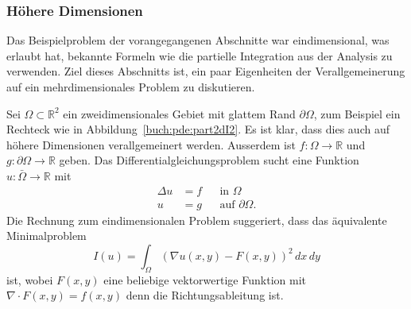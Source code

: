 \subsubsection{Höhere Dimensionen}
Das Beispielproblem der vorangegangenen Abschnitte war eindimensional,
was erlaubt hat, bekannte Formeln wie die partielle Integration aus der
Analysis zu verwenden.
Ziel dieses Abschnitts ist, ein paar Eigenheiten der Verallgemeinerung
auf ein mehrdimensionales Problem zu diskutieren.

Sei $\Omega\subset\mathbb R^2$ ein zweidimensionales Gebiet mit glattem
Rand $\partial \Omega$,
zum Beispiel ein Rechteck wie in Abbildung~\ref{buch:pde:part2dI2}.
Es ist klar, dass dies auch auf höhere Dimensionen verallgemeinert
werden.
Ausserdem ist $f\colon\Omega\to\mathbb R$ und
$g\colon\partial\Omega\to\mathbb R$ geben.
Das Differentialgleichungsproblem sucht
eine Funktion $u\colon\bar{\Omega}\to\mathbb R$ mit
\begin{equation}
\begin{aligned}
\Delta u&=f &&\text{in $\Omega$}
\\
u&=g&&\text{auf $\partial\Omega$}.
\end{aligned}
\label{buch:pde:eqn:dgl2d}
\end{equation}
Die Rechnung zum eindimensionalen Problem suggeriert, dass 
das äquivalente Minimalproblem 
\begin{equation}
I(u)
=
\int_{\Omega} (\nabla u(x,y) - F(x,y))^2\,dx\,dy
\label{buch:pde:eqn:minimal2d}
\end{equation}
ist, wobei $F(x,y)$ eine beliebige vektorwertige Funktion mit
$\nabla\cdot F(x,y) = f(x,y)$ denn die Richtungsableitung ist.


